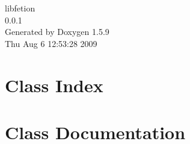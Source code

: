 \documentclass[a4paper]{book}
\begin{document}
\begin{titlepage}
\vspace*{7cm}
\begin{center}
{\Large libfetion \\[1ex]\large 0.0.1 }\\
\vspace*{1cm}
{\large Generated by Doxygen 1.5.9}\\
\vspace*{0.5cm}
{\small Thu Aug 6 12:53:28 2009}\\
\end{center}
\end{titlepage}
\clearemptydoublepage
{}
\tableofcontents
\clearemptydoublepage
{}
\chapter{Class Index}

\chapter{Class Documentation}




\printindex
\end{document}
